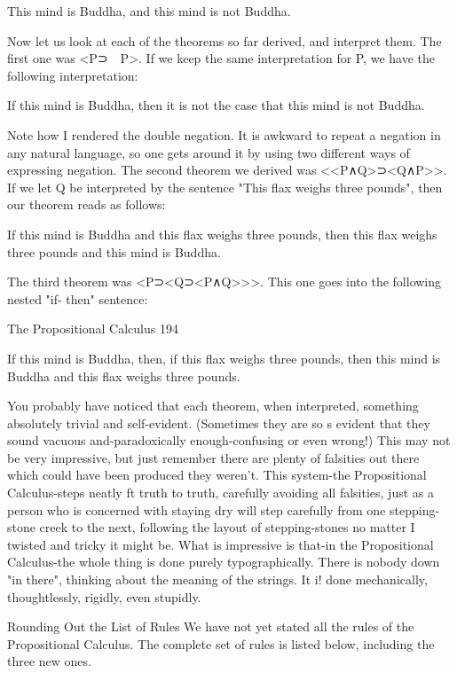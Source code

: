 This mind is Buddha, and this mind is not Buddha.

Now let us look at each of the theorems so far derived, and interpret them. The first one
was <P⊃~~P>. If we keep the same interpretation for P, we have the following
interpretation:

If this mind is Buddha,
         then it is not the case that this mind is not Buddha.

Note how I rendered the double negation. It is awkward to repeat a negation in any
natural language, so one gets around it by using two different ways of expressing
negation. The second theorem we derived was <<P∧Q>⊃<Q∧P>>. If we let Q be
interpreted by the sentence "This flax weighs three pounds", then our theorem reads as
follows:

If this mind is Buddha and this flax weighs three pounds,
         then this flax weighs three pounds and this mind is Buddha.

The third theorem was <P⊃<Q⊃<P∧Q>>>. This one goes into the following nested "if-
then" sentence:



The Propositional Calculus                                                                194

If this mind is Buddha,
         then, if this flax weighs three pounds,
                  then this mind is Buddha and this flax weighs three pounds.

        You probably have noticed that each theorem, when interpreted, something
absolutely trivial and self-evident. (Sometimes they are so s evident that they sound
vacuous and-paradoxically enough-confusing or even wrong!) This may not be very
impressive, but just remember there are plenty of falsities out there which could have
been produced they weren't. This system-the Propositional Calculus-steps neatly ft truth
to truth, carefully avoiding all falsities, just as a person who is concerned with staying dry
will step carefully from one stepping-stone creek to the next, following the layout of
stepping-stones no matter I twisted and tricky it might be. What is impressive is that-in
the Propositional Calculus-the whole thing is done purely typographically. There is
nobody down "in there", thinking about the meaning of the strings. It i! done
mechanically, thoughtlessly, rigidly, even stupidly.

                          Rounding Out the List of Rules
We have not yet stated all the rules of the Propositional Calculus. The complete set of
rules is listed below, including the three new ones.

